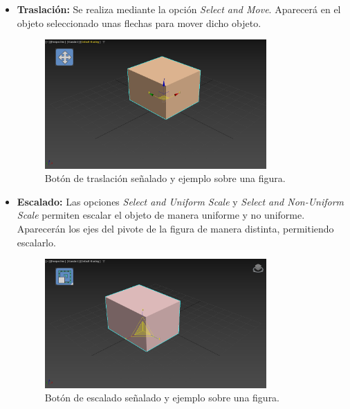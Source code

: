\documentclass{article}
\begin{document}
\begin{itemize}
    \item \textbf{Traslación: }Se realiza mediante la opción \textit{Select and Move}. Aparecerá en el objeto seleccionado unas flechas para mover dicho objeto.
    
    \begin{figure}[H]
        \centering
        \includegraphics[width=0.8\textwidth]{imagenes/trans.png}
        \caption{Botón de traslación señalado y ejemplo sobre una figura.}
     \end{figure}


     \newpage

    \item \textbf{Escalado: }Las opciones \textit{Select and Uniform Scale} y \textit{Select and Non-Uniform Scale} permiten escalar el objeto de manera uniforme y no uniforme. Aparecerán los ejes del pivote de la figura de manera distinta, permitiendo escalarlo.
    
    \begin{figure}[H]
        \centering
        \includegraphics[width=0.8\textwidth]{imagenes/scale.png}
        \caption{Botón de escalado señalado y ejemplo sobre una figura.}
     \end{figure}



\end{itemize}
\end{document}
